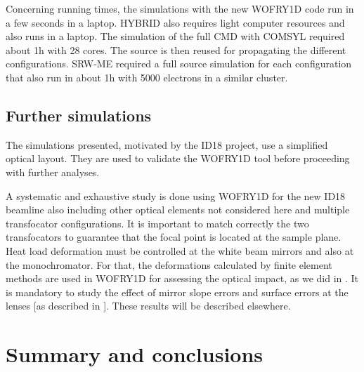 \documentclass{iucr}              %
\begin{document}
Concerning running times, the simulations with the new WOFRY1D code run in a few seconds in a laptop.
HYBRID also requires light computer resources and also runs in a laptop. 
The simulation of the full CMD with COMSYL required about 1h with 28 cores. The source is then reused for propagating the different configurations. SRW-ME required a full source simulation for each configuration that also run in about 1h with 5000 electrons in a similar cluster. 


\subsection{Further simulations}
\label{sec:discussion}

The simulations presented, motivated by the ID18 project, use a simplified optical layout. They are used to validate the WOFRY1D tool before proceeding with further analyses. 

A systematic and exhaustive study is done using WOFRY1D for the new ID18 beamline also including other optical elements not considered here and multiple transfocator configurations. It is important to match correctly the two transfocators to guarantee that the focal point is located at the sample plane. Heat load deformation must be controlled at the white beam mirrors and also at the monochromator. For that, the deformations calculated by finite element methods are used in WOFRY1D for assessing the optical impact, as we did in \cite{srioLBL}. It is mandatory to study the effect of mirror slope errors and surface errors at the lenses [as described in \cite{Celestre:mo5214}]. These results will be described elsewhere.


\section{Summary and conclusions}
\label{sec:summary}
\end{document}
